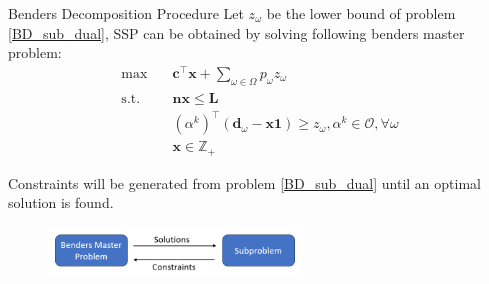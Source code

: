 \begin{frame}{Benders Decomposition Procedure}
  \small
  Let $z_{\omega}$ be the lower bound of problem \eqref{BD_sub_dual}, SSP can be obtained by solving following benders master problem:
  \begin{equation}\label{BD_master2}
    \begin{aligned}
      \max \quad & \mathbf{c}^{\intercal} \mathbf{x} + \sum_{\omega \in \Omega} p_{\omega} z_{\omega} \\
      \text {s.t.} \quad & \mathbf{n} \mathbf{x} \leq \mathbf{L} \\
      & (\alpha^{k})^{\intercal}(\mathbf{d}_{\omega}- \mathbf{x} \mathbf{1}) \geq z_{\omega}, \alpha^k \in \mathcal{O}, \forall \omega \\
       & \mathbf{x} \in \mathbb{Z}_{+}
    \end{aligned}
\end{equation} 

  Constraints will be generated from problem \eqref{BD_sub_dual} until an optimal solution is found.

  \begin{figure}[ht]
    \centering
    \includegraphics[width = 0.6\textwidth]{./images/BD.png}
  \end{figure}
\end{frame}





